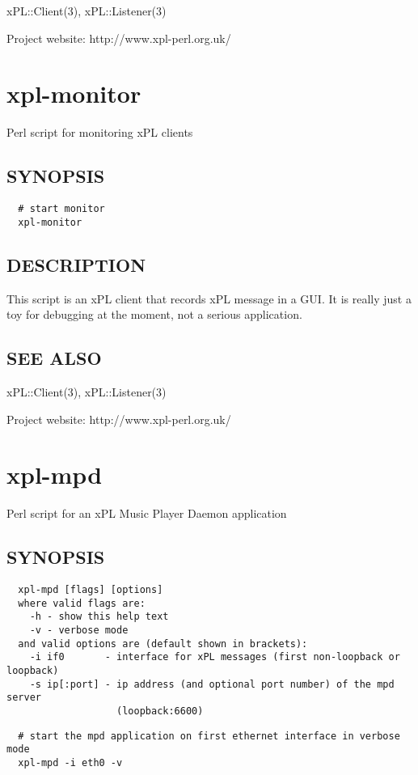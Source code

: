 xPL::Client(3), xPL::Listener(3)



Project website: http://www.xpl-perl.org.uk/

\section{xpl-monitor\label{xpl-monitor}}


Perl script for monitoring xPL clients

\subsection*{SYNOPSIS\label{xpl-monitor_SYNOPSIS}}
\begin{verbatim}
  # start monitor
  xpl-monitor
\end{verbatim}
\subsection*{DESCRIPTION\label{xpl-monitor_DESCRIPTION}}


This script is an xPL client that records xPL message in a GUI.  It is
really just a toy for debugging at the moment, not a serious
application.

\subsection*{SEE ALSO\label{xpl-monitor_SEE_ALSO}}


xPL::Client(3), xPL::Listener(3)



Project website: http://www.xpl-perl.org.uk/

\section{xpl-mpd\label{xpl-mpd}}


Perl script for an xPL Music Player Daemon application

\subsection*{SYNOPSIS\label{xpl-mpd_SYNOPSIS}}
\begin{verbatim}
  xpl-mpd [flags] [options]
  where valid flags are:
    -h - show this help text
    -v - verbose mode
  and valid options are (default shown in brackets):
    -i if0       - interface for xPL messages (first non-loopback or loopback)
    -s ip[:port] - ip address (and optional port number) of the mpd server
                   (loopback:6600)
\end{verbatim}
\begin{verbatim}
  # start the mpd application on first ethernet interface in verbose mode
  xpl-mpd -i eth0 -v
\end{verbatim}

